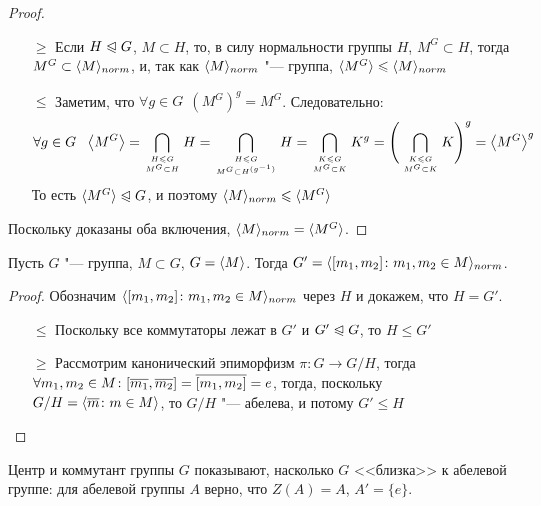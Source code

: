 \begin{proof}~
	\begin{itemize}
		\item[$\ge$] Если $H \trianglelefteqslant G$, $M \subset H$, то, в силу нормальности группы $H$, $M^G \subset H$, тогда $M^G \subset \langle M\rangle_{norm}$, и, так как $\langle M\rangle_{norm}$ "--- группа, $\langle M^G\rangle \leqslant \langle M\rangle_{norm}$
		
		\item[$\le$] Заметим, что $\forall g \in G\ \ (M^G)^g = M^G$. Следовательно:
		\[
			\forall g \in G\ \ \left\langle M^G\right\rangle = \bigcap_{H \leqslant G \atop {M^G \subset H}} H = \bigcap_{H \leqslant G \atop {M^G \subset H^{(g^{-1})}}} H = \bigcap_{K \leqslant G \atop {M^G \subset K}} K^g = \Bigg(\bigcap_{K \leqslant G \atop {M^G \subset K}} K\Bigg)^g = \left\langle M^G\right\rangle^g
		\]
		То есть $\langle M^G\rangle \trianglelefteqslant G$, и поэтому $\langle M\rangle_{norm} \leqslant \langle M^G\rangle$
	\end{itemize}
	Поскольку доказаны оба включения, $\langle M\rangle_{norm} = \langle M^G\rangle$.
\end{proof}

\begin{proposition}
	Пусть $G$ "--- группа, $M \subset G$, $G = \langle M\rangle$. Тогда $G' = \langle [m_1, m_2] \colon m_1, m_2 \in M\rangle_{norm}$.
\end{proposition}

\begin{proof}
	Обозначим $\langle[m_1, m_2] \colon m_1, m_2 \in M\rangle_{norm}$ через $H$ и докажем, что $H = G'$.
	\begin{itemize}
		\item[$\le$] Поскольку все коммутаторы лежат в $G'$ и $G' \trianglelefteqslant G$, то $H \le G'$
		
		\item[$\ge$] Рассмотрим канонический эпиморфизм $\pi \colon G \to G/ H$, тогда $\forall m_1, m_2 \in M \colon [\overline{m_1}, \overline{m_2}] = \overline{[m_1, m_2]} = e$, тогда, поскольку $G / H = \langle \overline{m} \colon m \in M\rangle$, то $G / H$ "--- абелева, и потому $G' \le H$
	\end{itemize}
\end{proof}

\begin{note}
	Центр и коммутант группы $G$ показывают, насколько $G$ <<близка>> к абелевой группе: для абелевой группы $A$ верно, что $Z(A) = A$, $A' = \{e\}$.
\end{note}